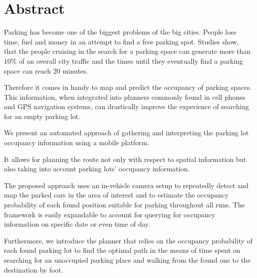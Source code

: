 \chapter*{Abstract}
\label{cha:abstract}

Parking has become one of the biggest problems of the big cities. People lose
time, fuel and money in an attempt to find a free parking spot. Studies show,
that the people cruising in the search for a parking space can generate more
than 10\% of an overall city traffic and the times until they eventually find
a parking space can reach 20 minutes.

Therefore it comes in handy to map and predict the occupancy of parking
spaces. This information, when integrated into planners commonly found in cell
phones and GPS navigation systems, can drastically improve the experience of
searching for an empty parking lot.

We present an automated approach of gathering and interpreting the parking lot
occupancy information using a mobile platform.

It allows for planning the route not only with respect to spatial information
but also taking into account parking lots' occupancy information.

The proposed approach uses an in-vehicle camera setup to repeatedly detect and
map the parked cars in the area of interest and to estimate the occupancy
probability of each found position suitable for parking throughout all runs.
The framework is easily expandable to account for querying for occupancy
information on specific date or even time of day.

Furthermore, we introduce the planner that relies on the occupancy
probability of each found parking lot to find the optimal path in the means of
time spent on searching for an unoccupied parking place and walking from the
found one to the destination by foot.



